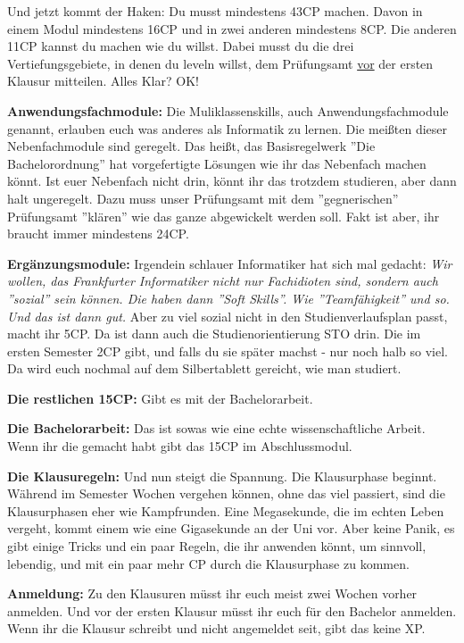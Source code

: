 Und jetzt kommt der Haken: Du musst mindestens 43CP machen. Davon in einem Modul
mindestens 16CP und in zwei anderen mindestens 8CP. Die anderen 11CP kannst
du machen wie du willst. Dabei musst du die drei Vertiefungsgebiete, in denen
du leveln willst, dem Pr\"ufungsamt \underline{vor} der ersten Klausur mitteilen. Alles
Klar? OK!

\textbf{Anwendungsfachmodule:}
Die Muliklassenskills, auch Anwendungsfachmodule genannt, erlauben euch was anderes als Informatik zu lernen.
Die mei{\ss}ten dieser Nebenfachmodule sind geregelt. Das hei{\ss}t, das
Basisregelwerk ''Die Bachelorordnung'' hat vorgefertigte L\"osungen wie ihr das
Nebenfach machen k\"onnt. Ist euer Nebenfach nicht drin, k\"onnt ihr das trotzdem studieren, aber dann halt ungeregelt.
Dazu muss unser Pr\"ufungsamt mit dem ''gegnerischen'' Pr\"ufungsamt ''kl\"aren'' wie das ganze abgewickelt werden soll.
Fakt ist aber, ihr braucht immer mindestens 24CP.

\textbf{Erg\"anzungsmodule:}
Irgendein schlauer Informatiker hat sich mal gedacht: \emph{Wir wollen, das
Frankfurter Informatiker nicht nur Fachidioten sind, sondern auch ''sozial''
sein k\"onnen. Die haben dann ''Soft Skills''. Wie ''Teamf\"ahigkeit'' und so. Und das
ist dann gut.} Aber zu viel sozial nicht in den Studienverlaufsplan passt, macht ihr 5CP.
Da ist dann auch die Studienorientierung STO drin. Die im ersten Semester 2CP gibt, und falls du sie sp\"ater machst - nur noch halb so viel.
Da wird euch nochmal auf dem Silbertablett gereicht, wie man studiert.

\textbf{Die restlichen 15CP:}
Gibt es mit der Bachelorarbeit.

\textbf{Die Bachelorarbeit:}
Das ist sowas wie eine echte wissenschaftliche Arbeit. Wenn ihr die gemacht habt gibt das 15CP im Abschlussmodul.

\textbf{Die Klausuregeln:}
Und nun steigt die Spannung. Die Klausurphase beginnt.
W\"ahrend im Semester Wochen vergehen k\"onnen, ohne das viel passiert, sind die Klausurphasen eher wie Kampfrunden.
Eine Megasekunde, die im echten Leben vergeht, kommt einem wie eine Gigasekunde an der Uni vor.
Aber keine Panik, es gibt einige Tricks und ein paar Regeln, die ihr
anwenden k\"onnt, um sinnvoll, lebendig, und mit ein paar mehr CP durch die
Klausurphase zu kommen.

\textbf{Anmeldung:}
Zu den Klausuren m\"usst ihr euch meist zwei Wochen vorher anmelden. Und vor der ersten Klausur m\"usst ihr euch f\"ur den Bachelor anmelden.
Wenn ihr die Klausur schreibt und nicht angemeldet seit, gibt das keine XP.

